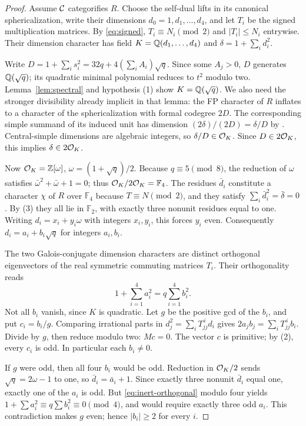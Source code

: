 \begin{proof}
Assume $\mathcal C$ categorifies $R$. Choose the self-dual lifts in its
canonical sphericalization, write their dimensions $d_0=1,d_1,\ldots,d_4$,
and let $T_i$ be the signed multiplication matrices. By
\eqref{eq:signed}, $T_i\equiv N_i\pmod2$ and $|T_i|\le N_i$ entrywise.
Their dimension character has field $K=\mathbb Q(d_1,\ldots,d_4)$ and
$\delta=1+\sum_i d_i^2$.

Write $D=1+\sum_i s_i^2=32q+4(\sum_i A_i)\sqrt q$.
Since some $A_j>0$, $D$ generates $\mathbb Q(\sqrt q)$; its quadratic
minimal polynomial reduces to $t^2$ modulo two. Lemma~\ref{lem:spectral}
and hypothesis (1) show $K=\mathbb Q(\sqrt q)$. We also need the stronger
divisibility already implicit in that lemma: the FP character of $R$
inflates to a character of the sphericalization with formal codegree
$2D$. The corresponding simple summand of its induced unit has
dimension $(2\delta)/(2D)=\delta/D$ by
\cite[Theorem 2.13]{Ostrik}. Central-simple dimensions are algebraic
integers, so $\delta/D\in\mathcal O_K$. Since $D\in2\mathcal O_K$, this implies
$\delta\in2\mathcal O_K$.

Now $\mathcal O_K=\mathbb Z[\omega]$, $\omega=(1+\sqrt q)/2$. Because
$q\equiv5\pmod8$, the reduction of $\omega$ satisfies
$\bar\omega^2+\bar\omega+1=0$; thus $\mathcal O_K/2\mathcal O_K=\mathbb F_4$.
The residues $\bar d_i$ constitute a character $\chi$ of $R$ over
$\mathbb F_4$ because $T\equiv N\pmod2$, and they satisfy
$\sum_i\bar d_i^2=\bar\delta=0$. By (3) they all lie in $\mathbb F_2$,
with exactly three nonunit residues equal to one. Writing
$d_i=x_i+y_i\omega$ with integers $x_i,y_i$, this forces $y_i$ even.
Consequently $d_i=a_i+b_i\sqrt q$ for integers $a_i,b_i$.

The two Galois-conjugate dimension characters are distinct orthogonal
eigenvectors of the real symmetric commuting matrices $T_i$. Their
orthogonality reads
\begin{equation}\label{eq:inert-orthogonal}
 1+\sum_{i=1}^4 a_i^2=q\sum_{i=1}^4 b_i^2.
\end{equation}
Not all $b_i$ vanish, since $K$ is quadratic. Let $g$ be the positive
gcd of the $b_i$, and put $c_i=b_i/g$. Comparing irrational parts in
$d_j^2=\sum_iT_{jj}^{\,i}d_i$ gives
$2a_jb_j=\sum_iT_{jj}^{\,i}b_i$. Divide by $g$, then reduce modulo
two: $Mc=0$. The vector $c$ is primitive; by (2), every $c_i$ is odd.
In particular each $b_i\ne0$.

If $g$ were odd, then all four $b_i$ would be odd. Reduction in
$\mathcal O_K/2$ sends $\sqrt q=2\omega-1$ to one, so
$\bar d_i=\bar a_i+1$. Since exactly three nonunit $\bar d_i$ equal
one, exactly one of the $a_i$ is odd. But
\eqref{eq:inert-orthogonal} modulo four yields
$1+\sum a_i^2\equiv q\sum b_i^2\equiv0\pmod4$, and would require
exactly three odd $a_i$. This contradiction makes $g$ even; hence
$|b_i|\ge2$ for every $i$.


\end{proof}
